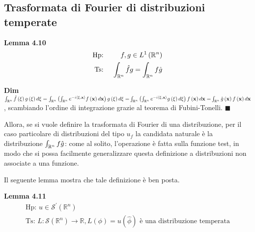 \documentclass{article}
\begin{document}
\subsection{Trasformata di Fourier di distribuzioni temperate}

\textbf{Lemma 4.10}%
\begin{eqnarray*}
\text{Hp}\text{: } &&f,g\in L^{1}\left( 
\mathbb{R}
^{n}\right) \\
\text{Ts}\text{: } &&\int_{%
\mathbb{R}
^{n}}\hat{f}g=\int_{%
\mathbb{R}
^{n}}f\hat{g}
\end{eqnarray*}

\textbf{Dim} $\int_{%
\mathbb{R}
^{n}}\hat{f}\left( \mathbf{\xi }\right) g\left( \mathbf{\xi }\right) d%
\mathbf{\xi }=\int_{%
\mathbb{R}
^{n}}\left( \int_{%
\mathbb{R}
^{n}}e^{-i\left\langle \mathbf{\xi ,x}\right\rangle }f\left( \mathbf{x}%
\right) d\mathbf{x}\right) g\left( \mathbf{\xi }\right) d\mathbf{\xi =}\int_{%
\mathbb{R}
^{n}}\left( \int_{%
\mathbb{R}
^{n}}e^{-i\left\langle \mathbf{\xi ,x}\right\rangle }g\left( \mathbf{\xi }%
\right) d\mathbf{\xi }\right) f\left( \mathbf{x}\right) d\mathbf{x=}\int_{%
\mathbb{R}
^{n}}\hat{g}\left( \mathbf{x}\right) f\left( \mathbf{x}\right) d\mathbf{x}$,
scambiando l'ordine di integrazione grazie al teorema di Fubini-Tonelli. $%
\blacksquare $

Allora, se si vuole definire la trasformata di Fourier di una distribuzione,
per il caso particolare di distribuzioni del tipo $u_{f}$ la candidata
naturale \`{e} la distribuzione $\int_{%
\mathbb{R}
^{n}}f\hat{g}$: come al solito, l'operazione \`{e} fatta sulla funzione
test, in modo che si possa facilmente generalizzare questa definizione a
distribuzioni non associate a una funzione.

Il seguente lemma mostra che tale definizione \`{e} ben posta.

\textbf{Lemma 4.11}%
\begin{gather*}
\text{Hp}\text{: }u\in \mathcal{S}^{\prime }\left( 
\mathbb{R}
^{n}\right) \\
\text{Ts}\text{: }L:\mathcal{S}\left( 
\mathbb{R}
^{n}\right) \rightarrow 
\mathbb{R}
,L\left( \phi \right) =u\left( \hat{\phi}\right) \text{ \`{e} una
distribuzione temperata}
\end{gather*}
\end{document}
